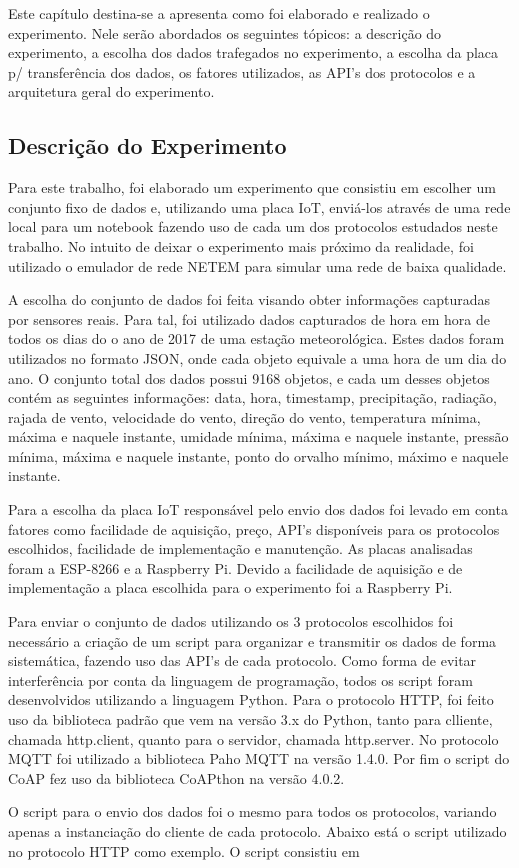 Este capítulo destina-se a apresenta como foi elaborado e realizado o experimento. Nele serão abordados os seguintes tópicos: a descrição do experimento, a escolha dos dados trafegados no experimento, a escolha da placa p/ transferência dos dados, os fatores utilizados, as API's dos protocolos e a arquitetura geral do experimento.

\subsection{Descrição do Experimento}

Para este trabalho, foi elaborado um experimento que consistiu em escolher um conjunto fixo de dados e, utilizando uma placa IoT, enviá-los através de uma rede local para um notebook fazendo uso de cada um dos protocolos estudados neste trabalho. No intuito de deixar o experimento mais próximo da realidade, foi utilizado o emulador de rede NETEM para simular uma rede de baixa qualidade. 

A escolha do conjunto de dados foi feita visando obter informações capturadas por sensores reais. Para tal, foi utilizado dados capturados de hora em hora de todos os dias do o ano de 2017 de uma estação meteorológica. Estes dados foram utilizados no formato JSON, onde cada objeto equivale a uma hora de um dia do ano. O conjunto total dos dados possui 9168 objetos, e cada um desses objetos contém as seguintes informações: data, hora, timestamp, precipitação, radiação, rajada de vento, velocidade do vento, direção do vento, temperatura mínima, máxima e naquele instante, umidade mínima, máxima e naquele instante, pressão mínima, máxima e naquele instante, ponto do orvalho mínimo, máximo e naquele instante.

Para a escolha da placa IoT responsável pelo envio dos dados foi levado em conta fatores como facilidade de aquisição, preço, API's disponíveis para os protocolos escolhidos, facilidade de implementação e manutenção. As placas analisadas foram a ESP-8266 e a Raspberry Pi. Devido a facilidade de aquisição e de implementação a placa escolhida para o experimento foi a Raspberry Pi.

Para enviar o conjunto de dados utilizando os 3 protocolos escolhidos foi necessário a criação de um script para organizar e transmitir os dados de forma sistemática, fazendo uso das API's de cada protocolo. Como forma de evitar interferência por conta da linguagem de programação, todos os script foram desenvolvidos utilizando a linguagem Python. Para o protocolo HTTP, foi feito uso da biblioteca padrão que vem na versão 3.x do Python, tanto para clliente, chamada http.client, quanto para o servidor, chamada http.server. No protocolo MQTT foi utilizado a biblioteca Paho MQTT na versão 1.4.0. Por fim o script do CoAP fez uso da biblioteca CoAPthon na versão 4.0.2.

O script para o envio dos dados foi o mesmo para todos os protocolos, variando apenas a instanciação do cliente de cada protocolo. Abaixo está o script utilizado no protocolo HTTP como exemplo. O script consistiu em 